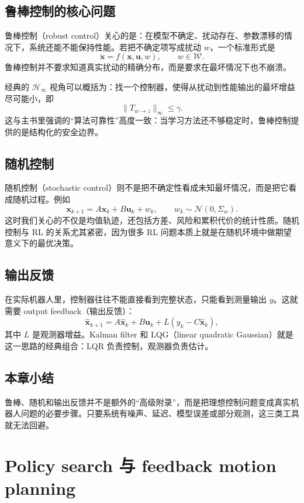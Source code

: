 \documentclass[a4paper]{article}
\newcommand{\bx}{\mathbf{x}}
\newcommand{\bu}{\mathbf{u}}
\begin{document}
\subsection{鲁棒控制的核心问题}

鲁棒控制（robust control）关心的是：在模型不确定、扰动存在、参数漂移的情况下，系统还能不能保持性能。若把不确定项写成扰动 $w$，一个标准形式是
\[
\dot{\bx} = f(\bx,\bu,w), \qquad w \in \mathcal{W}.
\]
鲁棒控制并不要求知道真实扰动的精确分布，而是要求在最坏情况下也不崩溃。

经典的 $\mathcal{H}_\infty$ 视角可以概括为：找一个控制器，使得从扰动到性能输出的最坏增益尽可能小，即
\[
\|T_{w\to z}\|_\infty \le \gamma.
\]
这与主书里强调的“算法可靠性”高度一致：当学习方法还不够稳定时，鲁棒控制提供的是结构化的安全边界。

\subsection{随机控制}

随机控制（stochastic control）则不是把不确定性看成未知最坏情况，而是把它看成随机过程。例如
\[
\bx_{k+1} = A\bx_k + B\bu_k + w_k,\qquad w_k \sim \mathcal{N}(0,\Sigma_w).
\]
这时我们关心的不仅是均值轨迹，还包括方差、风险和累积代价的统计性质。随机控制与 RL 的关系尤其紧密，因为很多 RL 问题本质上就是在随机环境中做期望意义下的最优决策。

\subsection{输出反馈}

在实际机器人里，控制器往往不能直接看到完整状态，只能看到测量输出 $y$。这就需要 output feedback（输出反馈）：
\[
\hat{\bx}_{k+1} = A\hat{\bx}_k + B\bu_k + L(y_k - C\hat{\bx}_k),
\]
其中 $L$ 是观测器增益。Kalman filter 和 LQG（linear quadratic Gaussian）就是这一思路的经典组合：LQR 负责控制，观测器负责估计。

\subsection{本章小结}

鲁棒、随机和输出反馈并不是额外的“高级附录”，而是把理想控制问题变成真实机器人问题的必要步骤。只要系统有噪声、延迟、模型误差或部分观测，这三类工具就无法回避。

\section{Policy search 与 feedback motion planning}
\end{document}
